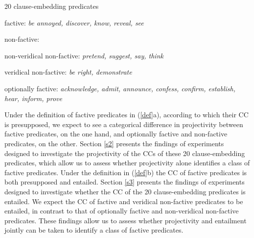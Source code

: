 \documentclass[11pt,fleqn]{article}
\newcommand{\6}{\mbox{$[\hspace*{-.6mm}[$}}
\newcommand{\9}{\mbox{$]\hspace*{-.6mm}]$}}
\begin{document}
\begin{exe}
\ex\label{pred} 20 clause-embedding predicates 

\begin{xlist}

\ex factive: {\em be annoyed, discover, know, reveal, see}

\ex non-factive:

\begin{xlist}

\ex non-veridical non-factive: {\em pretend, suggest, say, think}

\ex veridical non-factive: {\em be right, demonstrate}

\end{xlist}

\ex optionally factive: {\em acknowledge, admit, announce, confess, confirm, establish, hear, inform, prove}

\end{xlist}

\end{exe}

Under the definition of factive predicates in (\ref{def}a), according to which their CC is presupposed, we expect to see a categorical difference in projectivity between factive predicates, on the one hand, and optionally factive and non-factive predicates, on the other. Section \ref{s2} presents the findings of experiments designed to investigate the projectivity of the CCs of these 20 clause-embedding predicates, which allow us to assess whether projectivity alone identifies a class of factive predicates. Under the definition in (\ref{def}b) the CC of factive predicates is both presupposed and entailed. Section \ref{s3} presents the findings of experiments designed to investigate whether the CC of the 20 clause-embedding predicates is entailed. We expect the CC of factive and veridical non-factive predicates to be entailed, in contrast to that of optionally factive and non-veridical non-factive predicates. These findings allow us to assess whether projectivity and entailment jointly can be taken to identify a class of factive predicates.


\end{document}
